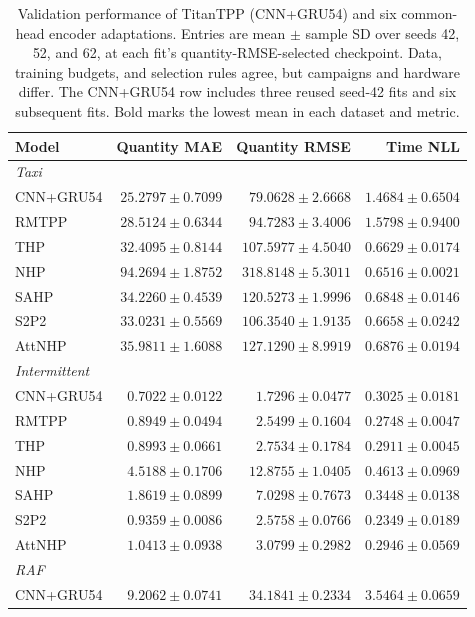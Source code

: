 \begin{table}[t]
\caption{Validation performance of TitanTPP (CNN+GRU54) and six common-head encoder adaptations. Entries are mean $\pm$ sample SD over seeds 42, 52, and 62, at each fit's quantity-RMSE-selected checkpoint. Data, training budgets, and selection rules agree, but campaigns and hardware differ. The CNN+GRU54 row includes three reused seed-42 fits and six subsequent fits. Bold marks the lowest mean in each dataset and metric.}
\label{tab:external-cnngru}
\centering\small
\setlength{\tabcolsep}{4pt}
\begin{tabular}{@{}lrrr@{}}
\toprule
Model & Quantity MAE & Quantity RMSE & Time NLL\\
\midrule
\multicolumn{4}{l}{\textit{Taxi}}\\
CNN+GRU54 & $\mathbf{25.2797\pm0.7099}$ & $\mathbf{79.0628\pm2.6668}$ & $1.4684\pm0.6504$\\
RMTPP & $28.5124\pm0.6344$ & $94.7283\pm3.4006$ & $1.5798\pm0.9400$\\
THP & $32.4095\pm0.8144$ & $107.5977\pm4.5040$ & $0.6629\pm0.0174$\\
NHP & $94.2694\pm1.8752$ & $318.8148\pm5.3011$ & $\mathbf{0.6516\pm0.0021}$\\
SAHP & $34.2260\pm0.4539$ & $120.5273\pm1.9996$ & $0.6848\pm0.0146$\\
S2P2 & $33.0231\pm0.5569$ & $106.3540\pm1.9135$ & $0.6658\pm0.0242$\\
AttNHP & $35.9811\pm1.6088$ & $127.1290\pm8.9919$ & $0.6876\pm0.0194$\\
\midrule
\multicolumn{4}{l}{\textit{Intermittent}}\\
CNN+GRU54 & $\mathbf{0.7022\pm0.0122}$ & $\mathbf{1.7296\pm0.0477}$ & $0.3025\pm0.0181$\\
RMTPP & $0.8949\pm0.0494$ & $2.5499\pm0.1604$ & $0.2748\pm0.0047$\\
THP & $0.8993\pm0.0661$ & $2.7534\pm0.1784$ & $0.2911\pm0.0045$\\
NHP & $4.5188\pm0.1706$ & $12.8755\pm1.0405$ & $0.4613\pm0.0969$\\
SAHP & $1.8619\pm0.0899$ & $7.0298\pm0.7673$ & $0.3448\pm0.0138$\\
S2P2 & $0.9359\pm0.0086$ & $2.5758\pm0.0766$ & $\mathbf{0.2349\pm0.0189}$\\
AttNHP & $1.0413\pm0.0938$ & $3.0799\pm0.2982$ & $0.2946\pm0.0569$\\
\midrule
\multicolumn{4}{l}{\textit{RAF}}\\
CNN+GRU54 & $9.2062\pm0.0741$ & $34.1841\pm0.2334$ & $3.5464\pm0.0659$\\

\end{tabular}
\end{table}
